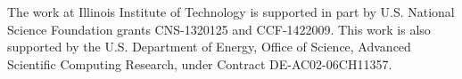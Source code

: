\documentclass[conference,compsoc]{IEEEtran}
\begin{document}
The work at Illinois Institute of Technology is supported in part by U.S. National Science Foundation grants CNS-1320125 and CCF-1422009. This work is also supported by the U.S. Department of Energy, Office of Science, Advanced Scientific Computing Research, under Contract DE-AC02-06CH11357.





  


% 




\end{document}
